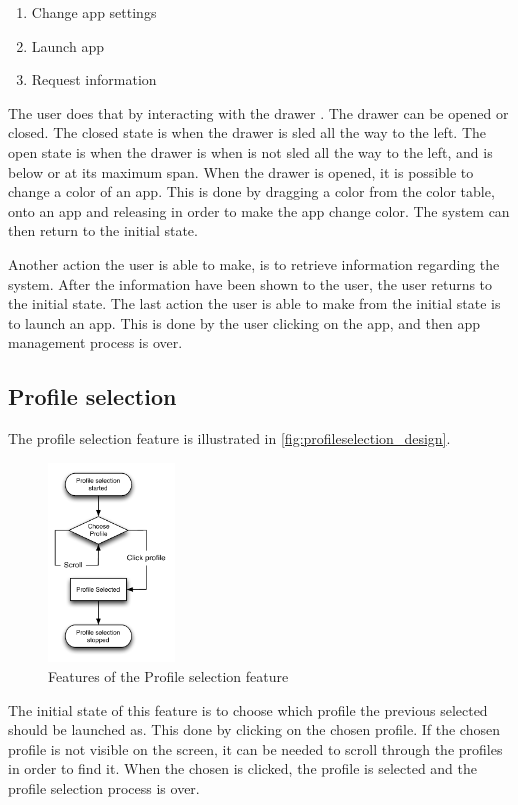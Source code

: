 \begin{enumerate}
	\item Change app settings
	\item Launch app
	\item Request information
\end{enumerate}

The user does that by interacting with the drawer .
The drawer can be opened or closed.
The closed state is when the drawer is sled all the way to the left.
The open state is when the drawer is when is not sled all the way to the left, and is below or at its maximum span.
When the drawer is opened, it is possible to change a color of an app.
This is done by dragging a color from the color table, onto an app and releasing in order to make the app change color.
The system can then return to the initial state.

Another action the user is able to make, is to retrieve information regarding the system.
After the information have been shown to the user, the user returns to the initial state.
The last action the user is able to make from the initial state is to launch an app.
This is done by the user clicking on the app, and then app management process is over.

\subsection{Profile selection}
The profile selection feature is illustrated in \autoref{fig:profileselection_design}. 
\label{design:profile_selection}
\begin{figure}[h]
	\centering
	\includegraphics[width=0.3\textwidth]{gfx/profileselect_design.pdf}
	\caption{Features of the Profile selection feature}
	\label{fig:profileselection_design}
\end{figure}
The initial state of this feature is to choose which profile the previous selected should be launched as. This done by clicking on the chosen profile. If the chosen profile is not visible on the screen, it can be needed to scroll through the profiles in order to find it. When the chosen is clicked, the profile is selected and the profile selection process is over.